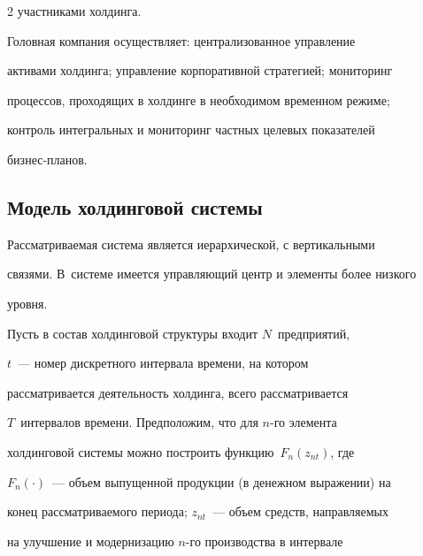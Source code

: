 \begin{multicols}{2}
участниками холдинга. 


     


     Головная компания осуществляет: централизованное управление 


активами холдинга; управление корпоративной стратегией; мониторинг 


процессов, проходящих в холдинге в необходимом временном режиме; 


контроль интегральных и мониторинг частных целевых показателей 


     биз\-нес-планов.


     


\vspace*{-3pt}





\subsection{Модель холдинговой системы} %










     


     Рассматриваемая система является иерархической, с вертикальными 


связями. В~системе имеется управляющий центр и элементы более низкого 


уровня. 


     


     Пусть в состав холдинговой структуры входит $N$~предприятий, 


     $t$~--- номер дискретного интервала времени, на котором 


рассматривается деятельность холдинга, всего рассматривается 


$T$~интервалов времени. Предположим, что для $n$-го элемента 


холдинговой системы можно построить функцию~$F_n(z_{nt})$, где 


$F_n(\cdot)$~--- объем выпущенной продукции (в денежном выражении) на 


конец рассматриваемого периода; $z_{nt}$~--- объем средств, направляемых 


на улучшение и модернизацию $n$-го производства в интервале 



\end{multicols}
